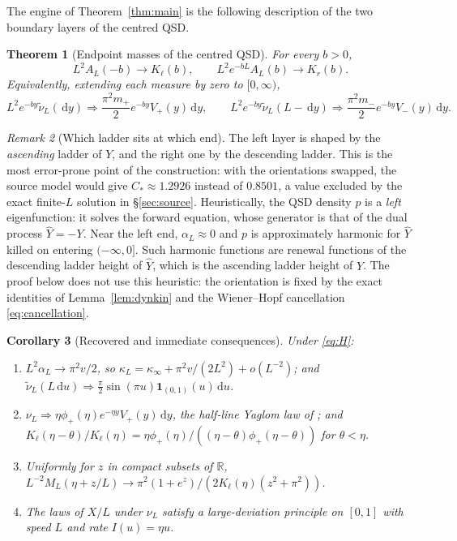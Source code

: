 \documentclass[11pt,a4paper]{article}
\newtheorem{theorem}{Theorem}[section]
\newtheorem{corollary}[theorem]{Corollary}
\theoremstyle{definition}
\theoremstyle{remark}
\newtheorem{remark}[theorem]{Remark}
\newcommand{\R}{\mathbb R}
\newcommand{\1}{\mathbf 1}
\newcommand{\dd}{\,\mathrm d}
\newcommand{\Kl}{K_{\ell}}
\newcommand{\Kr}{K_{r}}
\newcommand{\kinf}{\kappa_\infty}
\begin{document}
The engine of Theorem~\ref{thm:main} is the following description of the two boundary layers of the centred QSD.
\begin{theorem}[Endpoint masses of the centred QSD]\label{thm:endpoint}
For every $b>0$,
\begin{equation}\label{eq:boundary-laplace}
 L^2A_L(-b)\longrightarrow\Kl(b),\qquad L^2e^{-bL}A_L(b)\longrightarrow\Kr(b).
\end{equation}
Equivalently, extending each measure by zero to $[0,\infty)$,
\begin{equation}\label{eq:weighted-boundary}
 L^2e^{-by}\widetilde\nu_L(\dd y)\Rightarrow\frac{\pi^2m_+}{2}e^{-by}V_+(y)\dd y,\qquad
 L^2e^{-by}\widetilde\nu_L(L-\dd y)\Rightarrow\frac{\pi^2m_-}{2}e^{-by}V_-(y)\dd y.
\end{equation}
\end{theorem}

\begin{remark}[Which ladder sits at which end]\label{rem:orientation}
The left layer is shaped by the \emph{ascending} ladder of $Y$, and the right one by the descending ladder. This is the most error-prone point of the construction: with the orientations swapped, the source model would give $C_*\approx1.2926$ instead of $0.8501$, a value excluded by the exact finite-$L$ solution in \S\ref{sec:source}. Heuristically, the QSD density $p$ is a \emph{left} eigenfunction: it solves the forward equation, whose generator is that of the dual process $\widehat Y=-Y$. Near the left end, $\alpha_L\approx0$ and $p$ is approximately harmonic for $\widehat Y$ killed on entering $(-\infty,0]$. Such harmonic functions are renewal functions of the descending ladder height of $\widehat Y$, which is the ascending ladder height of $Y$. The proof below does not use this heuristic: the orientation is fixed by the exact identities of Lemma~\ref{lem:dynkin} and the Wiener--Hopf cancellation \eqref{eq:cancellation}.
\end{remark}

\begin{corollary}[Recovered and immediate consequences]\label{cor:consequences}
Under \eqref{eq:H}:
\begin{enumerate}[label=(\roman*)]
\item $L^2\alpha_L\to\pi^2v/2$, so $\kappa_L=\kinf+\pi^2v/(2L^2)+o(L^{-2})$; and $\widetilde\nu_L(L\dd u)\Rightarrow\frac\pi2\sin(\pi u)\1_{(0,1)}(u)\dd u$.
\item $\nu_L\Rightarrow\eta\phi_+(\eta)e^{-\eta y}V_+(y)\dd y$, the half-line Yaglom law of \cite[Theorem 1]{kypalm}; and $\Kl(\eta-\theta)/\Kl(\eta)=\eta\phi_+(\eta)/((\eta-\theta)\phi_+(\eta-\theta))$ for $\theta<\eta$.
\item Uniformly for $z$ in compact subsets of $\R$, $L^{-2}M_L(\eta+z/L)\to\pi^2(1+e^z)/(2\Kl(\eta)(z^2+\pi^2))$.
\item The laws of $X/L$ under $\nu_L$ satisfy a large-deviation principle on $[0,1]$ with speed $L$ and rate $I(u)=\eta u$.
\end{enumerate}
\end{corollary}
\end{document}
